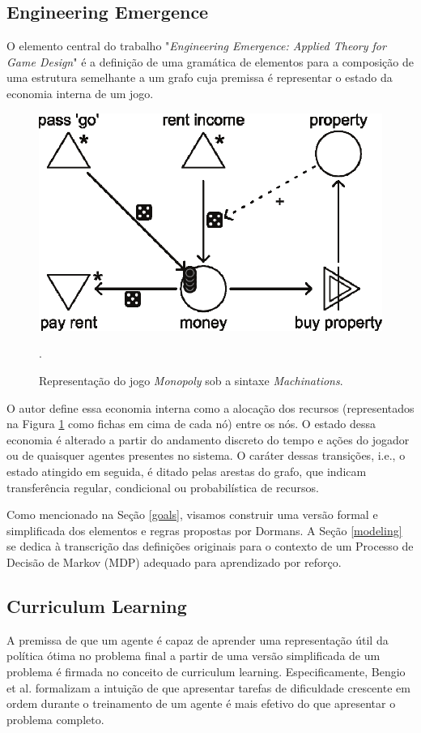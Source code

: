 \documentclass[conference]{IEEEtran}
\begin{document}
\subsection{Engineering Emergence}
\label{references:machinations}
O elemento central do trabalho "\textit{Engineering Emergence: Applied Theory for Game Design}"\cite{machinations} é a definição de uma gramática de elementos para a composição de uma estrutura semelhante a um grafo cuja premissa é representar o estado da economia interna de um jogo.
\begin{figure}[h!]
    \centering
    \includegraphics[width=0.9\linewidth]{figures/monopoly.png}
    \caption{Representação do jogo \textit{Monopoly} sob a sintaxe \textit{Machinations}.}.
    \label{fig:monopoly}
\end{figure}

O autor define essa economia interna como a alocação dos recursos (representados na Figura \ref{fig:monopoly} como fichas em cima de cada nó) entre os nós. O estado dessa economia é alterado a partir do andamento discreto do tempo e ações do jogador ou de quaisquer agentes presentes no sistema. O caráter dessas transições, i.e., o estado atingido em seguida, é ditado pelas arestas do grafo, que indicam transferência regular, condicional ou probabilística de recursos.

Como mencionado na Seção \ref{goals}, visamos construir uma versão formal e simplificada dos elementos e regras propostas por Dormans. A Seção \ref{modeling} se dedica à transcrição das definições originais para o contexto de um Processo de Decisão de Markov (MDP) adequado para aprendizado por reforço.

\subsection{Curriculum Learning}
A premissa de que um agente é capaz de aprender uma representação útil da política ótima no problema final a partir de uma versão simplificada de um problema é firmada no conceito de curriculum learning. Especificamente, Bengio et al.\cite{curriculum} formalizam a intuição de que apresentar tarefas de dificuldade crescente em ordem durante o treinamento de um agente é mais efetivo do que apresentar o problema completo.
\end{document}
